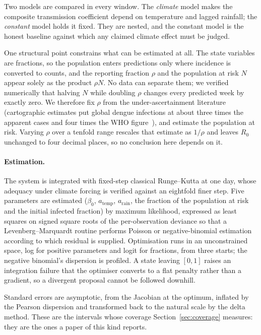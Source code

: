 \documentclass[11pt,a4paper]{article}
\begin{document}
Two models are compared in every window. The \emph{climate} model makes the
composite transmission coefficient depend on temperature and lagged rainfall; the
\emph{constant} model holds it fixed. They are nested, and the constant model is
the honest baseline against which any claimed climate effect must be judged.

One structural point constrains what can be estimated at all. The state variables
are fractions, so the population enters predictions only where incidence is
converted to counts, and the reporting fraction $\rho$ and the population at risk
$N$ appear solely as the product $\rho N$. No data can separate them; we verified
numerically that halving $N$ while doubling $\rho$ changes every predicted week by
exactly zero. We therefore fix $\rho$ from the under-ascertainment
literature (cartographic estimates put global dengue infections at about three
times the apparent cases and four times the WHO figure~\cite{bhatt}), and
estimate the population at risk. Varying $\rho$ over a tenfold range rescales that
estimate as $1/\rho$ and leaves $R_0$ unchanged to four decimal places, so no
conclusion here depends on it.

\paragraph{Estimation.} The system is integrated with fixed-step classical
Runge--Kutta at one day, whose adequacy under climate forcing is verified against
an eightfold finer step. Five parameters are estimated ($\beta_0$,
$a_{\mathrm{temp}}$, $a_{\mathrm{rain}}$, the fraction of the population at risk
and the initial infected fraction) by maximum likelihood, expressed as
least squares on signed square roots of the per-observation deviance so that a
Levenberg--Marquardt routine performs Poisson or negative-binomial estimation
according to which residual is supplied. Optimisation runs in an unconstrained
space, log for positive parameters and logit for fractions, from three starts;
the negative binomial's dispersion is profiled. A state leaving $[0,1]$ raises an
integration failure that the optimiser converts to a flat penalty rather than a
gradient, so a divergent proposal cannot be followed downhill.

Standard errors are asymptotic, from the Jacobian at the optimum, inflated by the
Pearson dispersion and transformed back to the natural scale by the delta method.
These are the intervals whose coverage Section~\ref{sec:coverage} measures: they
are the ones a paper of this kind reports.
\end{document}

